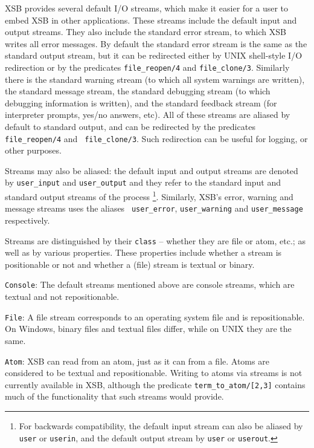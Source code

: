 XSB provides several default I/O streams, which make it easier for a
user to embed XSB in other applications.  These streams include the
default input and output streams.  They also include the standard
error stream, to which XSB writes all error messages.  By default the
standard error stream is the same as the standard output stream, but
it can be redirected either by UNIX shell-style I/O redirection or by
the predicates {\tt file\_reopen/4} and {\tt file\_clone/3}.
Similarly there is the standard warning stream (to which all system
warnings are written), the standard message stream, the standard
debugging stream (to which debugging information is written), and the
standard feedback stream (for interpreter prompts, yes/no answers,
etc).  All of these streams are aliased by default to standard output,
and can be redirected by the predicates {\tt file\_reopen/4} and {\tt
  file\_clone/3}.  Such redirection can be useful for logging, or
other purposes.


Streams may also be aliased: the default input and output streams are
denoted by {\tt user\_input} and {\tt user\_output} and they refer to
the standard input and standard output streams of the
process \footnote{For backwards compatibility, the default input
  stream can also be aliased by {\tt user} or {\tt userin}, and the
  default output stream by {\tt user} or {\tt userout}.}.  Similarly,
XSB's error, warning and message streams uses the aliases {\tt
  user\_error}, {\tt user\_warning} and {\tt user\_message}
respectively.

Streams are distinguished by their {\tt class} -- whether they are
file or atom, etc.; as well as by various properties.  These
properties include whether a stream is positionable or not and whether
a (file) stream is textual or binary.

\bi
\item {\tt Console}: The default streams mentioned above are
console streams, which are textual and not repositionable.
%
\item {\tt File}:  A file stream corresponds to an operating system
file and is repositionable.  On Windows, binary files and textual
files differ, while on UNIX they are the same.  
%
\item {\tt Atom}: XSB can read from an atom, just as it can from a file.
Atoms are considered to be textual and repositionable.  Writing to
atoms via streams is not currently available in XSB, although 
the predicate {\tt term\_to\_atom/[2,3]} contains much of the
functionality that such streams would provide.

